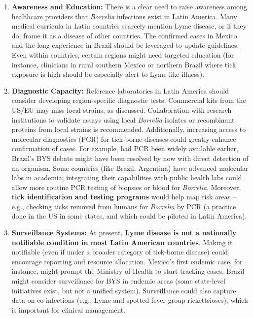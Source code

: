 \documentclass[11pt,letterpaper]{article}
\begin{document}
\begin{enumerate}
    \item \textbf{Awareness and Education:} There is a clear need to raise awareness among healthcare providers that \textit{Borrelia} infections exist in Latin America. Many medical curricula in Latin countries scarcely mention Lyme disease, or if they do, frame it as a disease of other countries. The confirmed cases in Mexico and the long experience in Brazil should be leveraged to update guidelines. Even within countries, certain regions might need targeted education (for instance, clinicians in rural southern Mexico or northern Brazil where tick exposure is high should be especially alert to Lyme-like illness).

    \item \textbf{Diagnostic Capacity:} Reference laboratories in Latin America should consider developing region-specific diagnostic tests. Commercial kits from the US/EU may miss local strains, as discussed. Collaboration with research institutions to validate assays using local \textit{Borrelia} isolates or recombinant proteins from local strains is recommended. Additionally, increasing access to molecular diagnostics (PCR) for tick-borne diseases could greatly enhance confirmation of cases. For example, had PCR been widely available earlier, Brazil’s BYS debate might have been resolved by now with direct detection of an organism. Some countries (like Brazil, Argentina) have advanced molecular labs in academia; integrating their capabilities with public health labs could allow more routine PCR testing of biopsies or blood for \textit{Borrelia}. Moreover, \textbf{tick identification and testing programs} would help map risk areas – e.g., checking ticks removed from humans for \textit{Borrelia} by PCR (a practice done in the US in some states, and which could be piloted in Latin America).

    \item \textbf{Surveillance Systems:} At present, \textbf{Lyme disease is not a nationally notifiable condition in most Latin American countries}. Making it notifiable (even if under a broader category of tick-borne disease) could encourage reporting and resource allocation. Mexico’s first endemic case, for instance, might prompt the Ministry of Health to start tracking cases. Brazil might consider surveillance for BYS in endemic areas (some state-level initiatives exist, but not a unified system). Surveillance could also capture data on co-infections (e.g., Lyme and spotted fever group rickettsioses), which is important for clinical management.


\end{enumerate}
\end{document}
